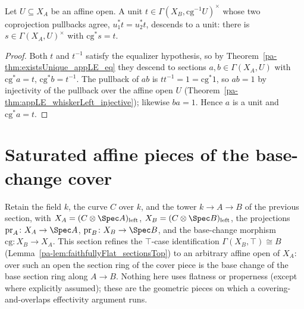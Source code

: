 \begin{theorem}
  \label{pa-thm:exists_unitsAppLE_eq}
  \leanok

  Let \(U \subseteq X_A\) be an affine open. A unit \(t \in \Gamma(X_B,
  \mathrm{cg}^{-1}U)^{\times}\) whose two coprojection pullbacks agree, \(u_1^{*} t = u_2^{*}
  t\), descends to a unit: there is \(s \in \Gamma(X_A, U)^{\times}\) with \(\mathrm{cg}^{*} s =
  t\).
\end{theorem}
\begin{proof}
  \leanok
  Both \(t\) and \(t^{-1}\) satisfy the equalizer hypothesis, so by
  Theorem~\ref{pa-thm:existsUnique_appLE_eq} they descend to sections \(a, b \in \Gamma(X_A, U)\)
  with \(\mathrm{cg}^{*} a = t\), \(\mathrm{cg}^{*} b = t^{-1}\).  The pullback of \(ab\) is \(t
  t^{-1} = 1 = \mathrm{cg}^{*} 1\), so \(ab = 1\) by injectivity of the pullback over the affine
  open \(U\) (Theorem~\ref{pa-thm:appLE_whiskerLeft_injective}); likewise \(ba = 1\).  Hence \(a\)
  is a unit and \(\mathrm{cg}^{*} a = t\).
\end{proof}

\section{Saturated affine pieces of the base-change cover}
\label{pa-sec:effectivityPieces}

Retain the field \(k\), the curve \(C\) over \(k\), and the tower \(k \to A \to B\) of the
previous section, with \(X_A = (C \otimes \Spec A)_{\mathrm{left}}\), \(X_B = (C \otimes \Spec
B)_{\mathrm{left}}\), the projections \(\mathrm{pr}_A \colon X_A \to \Spec A\), \(\mathrm{pr}_B
\colon X_B \to \Spec B\), and the base-change morphism \(\mathrm{cg} \colon X_B \to X_A\). This
section refines the \(\top\)-case identification \(\Gamma(X_B, \top) \cong B\)
(Lemma~\ref{pa-lem:faithfullyFlat_sectionsTop}) to an arbitrary affine open of \(X_A\): over such an
open the section ring of the cover piece is the base change of the base section ring along \(A
\to B\). Nothing here uses flatness or properness (except where explicitly assumed); these are
the geometric pieces on which a covering-and-overlaps effectivity argument runs.

